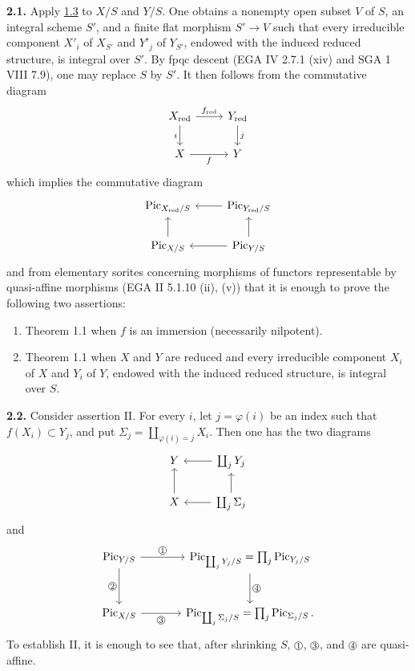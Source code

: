 \textbf{2.1.} Apply \hyperlink{sga6.e12.lem.1-3}{1.3} to $X/S$ and $Y/S$. One obtains a nonempty open
subset $V$ of $S$, an integral scheme $S'$, and a finite flat morphism
$S'\to V$ such that every irreducible component $X'_i$ of $X_{S'}$ and
$Y'_j$ of $Y_{S'}$, endowed with the induced reduced structure, is integral
over $S'$. By fpqc descent (EGA IV 2.7.1 (xiv) and SGA 1 VIII 7.9), one may
replace $S$ by $S'$. It then follows from the commutative diagram
\[
\begin{tikzcd}
X_{\red} \arrow[r,"f_{\red}"] \arrow[d,"i"'] & Y_{\red} \arrow[d,"j"]\\
X \arrow[r,"f"'] & Y
\end{tikzcd}
\]
which implies the commutative diagram
\[
\begin{tikzcd}
\Pic_{X_{\red}/S} & \Pic_{Y_{\red}/S} \arrow[l]\\
\Pic_{X/S} \arrow[u] & \Pic_{Y/S} \arrow[l] \arrow[u]
\end{tikzcd}
\]
and from elementary sorites concerning morphisms of functors representable
by quasi-affine morphisms (EGA II 5.1.10 (ii), (v)) that it is enough to prove
the following two assertions:
\begin{enumerate}[label=\Roman*.]
\item Theorem 1.1 when $f$ is an immersion (necessarily nilpotent).
\item Theorem 1.1 when $X$ and $Y$ are reduced and every irreducible component
  $X_i$ of $X$ and $Y_i$ of $Y$, endowed with the induced reduced structure,
  is integral over $S$.
\end{enumerate}

\textbf{2.2.} Consider assertion II. For every $i$, let $j=\varphi(i)$ be an
index such that $f(X_i)\subset Y_j$, and put
$\Sigma_j=\coprod_{\varphi(i)=j}X_i$. Then one has the two diagrams
\[
\begin{tikzcd}
Y & \coprod_jY_j \arrow[l]\\
X \arrow[u] & \coprod_j\Sigma_j \arrow[l] \arrow[u]
\end{tikzcd}
\]
and
\[
\begin{tikzcd}[column sep=large,row sep=large]
\Pic_{Y/S} \arrow[r,"\sgacircled{1}"] \arrow[d,"\sgacircled{2}"'] &
\Pic_{\coprod_jY_j/S}=\prod_j\Pic_{Y_j/S}
  \arrow[d,"\sgacircled{4}"]\\
\Pic_{X/S} \arrow[r,"\sgacircled{3}"'] &
\Pic_{\coprod_j\Sigma_j/S}=\prod_j\Pic_{\Sigma_j/S}.
\end{tikzcd}
\]
To establish II, it is enough to see that, after shrinking $S$,
$\sgacircled{1}$, $\sgacircled{3}$, and $\sgacircled{4}$ are quasi-affine.

